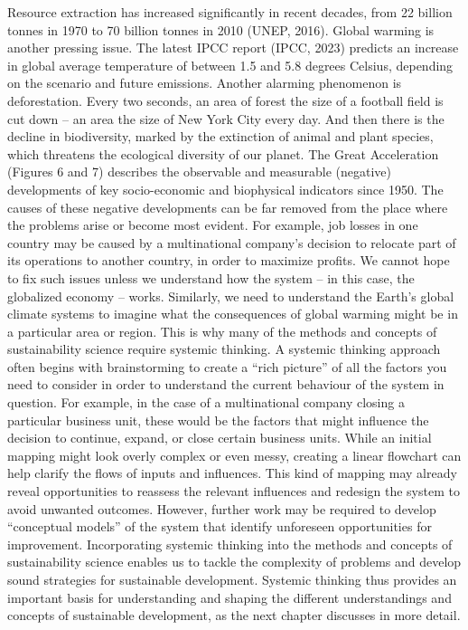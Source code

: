 \documentclass[
  letterpaper,
  DIV=11,
  numbers=noendperiod]{scrreprt}
\begin{document}
Resource extraction has increased significantly in recent decades, from
22 billion tonnes in 1970 to 70 billion tonnes in 2010 (UNEP, 2016).
Global warming is another pressing issue. The latest IPCC report (IPCC,
2023) predicts an increase in global average temperature of between 1.5
and 5.8 degrees Celsius, depending on the scenario and future emissions.
Another alarming phenomenon is deforestation. Every two seconds, an area
of forest the size of a football field is cut down -- an area the size
of New York City every day. And then there is the decline in
biodiversity, marked by the extinction of animal and plant species,
which threatens the ecological diversity of our planet. The Great
Acceleration (Figures 6 and 7) describes the observable and measurable
(negative) developments of key socio-economic and biophysical indicators
since 1950. The causes of these negative developments can be far removed
from the place where the problems arise or become most evident. For
example, job losses in one country may be caused by a multinational
company's decision to relocate part of its operations to another
country, in order to maximize profits. We cannot hope to fix such issues
unless we understand how the system -- in this case, the globalized
economy -- works. Similarly, we need to understand the Earth's global
climate systems to imagine what the consequences of global warming might
be in a particular area or region. This is why many of the methods and
concepts of sustainability science require systemic thinking. A systemic
thinking approach often begins with brainstorming to create a ``rich
picture'' of all the factors you need to consider in order to understand
the current behaviour of the system in question. For example, in the
case of a multinational company closing a particular business unit,
these would be the factors that might influence the decision to
continue, expand, or close certain business units. While an initial
mapping might look overly complex or even messy, creating a linear
flowchart can help clarify the flows of inputs and influences. This kind
of mapping may already reveal opportunities to reassess the relevant
influences and redesign the system to avoid unwanted outcomes. However,
further work may be required to develop ``conceptual models'' of the
system that identify unforeseen opportunities for improvement.
Incorporating systemic thinking into the methods and concepts of
sustainability science enables us to tackle the complexity of problems
and develop sound strategies for sustainable development. Systemic
thinking thus provides an important basis for understanding and shaping
the different understandings and concepts of sustainable development, as
the next chapter discusses in more detail.
\end{document}
